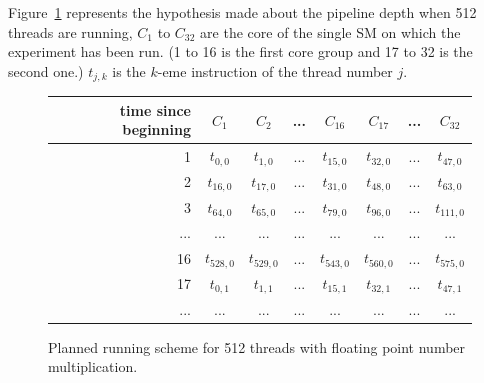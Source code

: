 \documentclass{report}
\begin{document}
    Figure~\ref{fig:fp_prediction_512}
    represents the hypothesis made about the pipeline depth when 512 threads are running, $C_1$ to
    $C_{32}$ are the core of the single SM on which the experiment has been run. (1 to 16 is the
    first core group and 17 to 32 is the second one.) $t_{j,k}$ is the $k$-eme instruction of the thread number $j$. 
        \begin{figure}[H]
      \centering
       \begin{tabular}{ | r || c | c | c | c || c | c | c | }
    	    \hline
    	    time since beginning & $C_1$ & $C_2$ & ... & $C_{16}$ & $C_{17}$ & ... & $C_{32}$ \\ \hline  \hline
    	   1 & $t_{0,0}$ & $t_{1,0}$ & ... & $t_{15,0}$ & $t_{32, 0}$ & ... & $t_{47, 0}$ \\ \hline 
    	   2 & $t_{16,0}$ & $t_{17,0}$ & ... & $t_{31,0}$ & $t_{48, 0}$ & ... & $t_{63, 0}$ \\ \hline
    	   3 & $t_{64,0}$ & $t_{65,0}$ & ... & $t_{79,0}$ & $t_{96, 0}$ & ... & $t_{111, 0}$ \\ \hline
    	   ... & ... & ... & ... & ... & ... & ... & ... \\ \hline
    	   16 & $t_{528,0}$ & $t_{529,0}$ & ... & $t_{543,0}$ & $t_{560,0}$ & ... & $t_{575, 0}$ \\ \hline
    	   17 & $t_{0,1}$ & $t_{1,1}$ & ... & $t_{15,1}$ & $t_{32, 1}$ & ... & $t_{47, 1}$ \\ \hline
    	   ... & ... & ... & ... & ... & ... & ... & ... \\ \hline
  	\end{tabular}
  	\captionsetup{justification=centering}
  	\caption{Planned running scheme for 512 threads with floating point number multiplication.}
  	\label{fig:fp_prediction_512}
   \end{figure}
   
\end{document}
